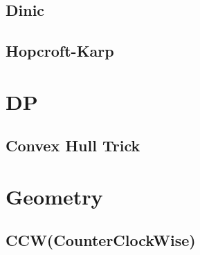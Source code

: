 \documentclass[10pt, a4paper]{article}
\begin{document}
\subsection{Dinic}


\subsection{Hopcroft-Karp}


% 



\section{DP}

\subsection{Convex Hull Trick}


% 



\section{Geometry}

\subsection{CCW(CounterClockWise)}

\end{document}
